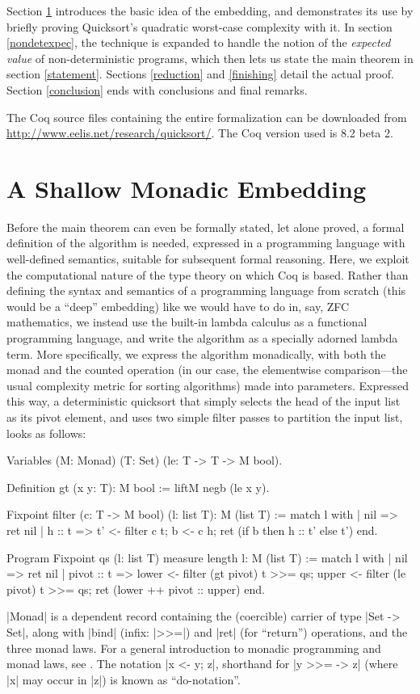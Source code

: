 \documentclass[runningheads]{llncs}
\begin{document}
Section \ref{embed} introduces the basic idea of the embedding, and demonstrates its use by briefly proving Quicksort's quadratic worst-case complexity with it. In section \ref{nondetexpec}, the technique is expanded to handle the notion of the \emph{expected value} of non-deterministic programs, which then lets us state the main theorem in section \ref{statement}. Sections \ref{reduction} and \ref{finishing} detail the actual proof. Section \ref{conclusion} ends with conclusions and final remarks.

The Coq source files containing the entire formalization can be downloaded from \url{http://www.eelis.net/research/quicksort/}. The Coq version used is 8.2 beta 2.

\section{A Shallow Monadic Embedding}
\label{embed}

Before the main theorem can even be formally stated, let alone proved, a formal definition of the algorithm is needed, expressed in a programming language with well-defined semantics, suitable for subsequent formal reasoning. Here, we exploit the computational nature of the type theory on which Coq is based. Rather than defining the syntax and semantics of a programming language from scratch (this would be a ``deep'' embedding) like we would have to do in, say, ZFC mathematics, we instead use the built-in lambda calculus as a functional programming language, and write the algorithm as a specially adorned lambda term. More specifically, we express the algorithm monadically, with both the monad and the counted operation (in our case, the elementwise comparison---the usual complexity metric for sorting algorithms) made into parameters. Expressed this way, a deterministic quicksort that simply selects the head of the input list as its pivot element, and uses two simple filter passes to partition the input list, looks as follows:

\begin{code}
  Variables (M: Monad) (T: Set) (le: T -> T -> M bool).

  Definition gt (x y: T): M bool := liftM negb (le x y).

  Fixpoint filter (c: T -> M bool) (l: list T): M (list T) :=
    match l with
    | nil => ret nil
    | h :: t =>
      t' <- filter c t;
      b <- c h;
      ret (if b then h :: t' else t')
    end.

  Program Fixpoint qs (l: list T) {measure length l}: M (list T) :=
    match l with
    | nil => ret nil
    | pivot :: t =>
        lower <- filter (gt pivot) t >>= qs;
        upper <- filter (le pivot) t >>= qs;
        ret (lower ++ pivot :: upper)
    end.
\end{code}
|Monad| is a dependent record containing the (coercible) carrier of type |Set -> Set|, along with |bind| (infix: |>>=|) and |ret| (for ``return'') operations, and the three monad laws. For a general introduction to monadic programming and monad laws, see \cite{wadler93monads}. The notation |x <- y; z|, shorthand for |y >>= \x -> z| (where |x| may occur in |z|) is known as ``do-notation''.
\end{document}
